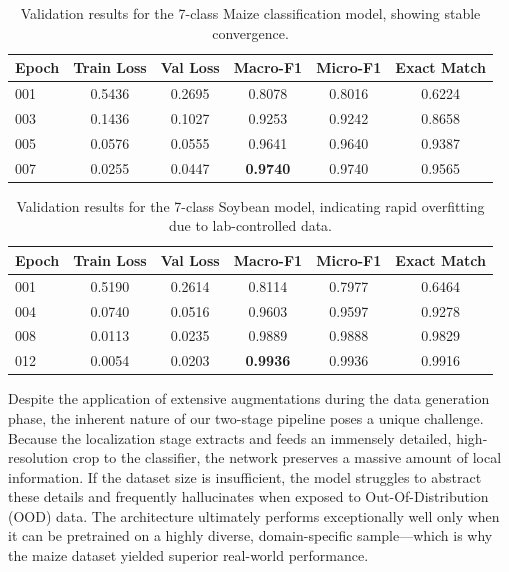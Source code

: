 \begin{table}[h]
\centering
\begin{tabular}{l c c c c c}
\hline
Epoch & Train Loss & Val Loss & Macro-F1 & Micro-F1 & Exact Match \\
\hline
001 & 0.5436 & 0.2695 & 0.8078 & 0.8016 & 0.6224 \\
003 & 0.1436 & 0.1027 & 0.9253 & 0.9242 & 0.8658 \\
005 & 0.0576 & 0.0555 & 0.9641 & 0.9640 & 0.9387 \\
007 & 0.0255 & 0.0447 & \textbf{0.9740} & 0.9740 & 0.9565 \\
\hline
\end{tabular}
\caption{Validation results for the 7-class Maize classification model, showing stable convergence.}
\label{tab:maize_classification}
\end{table}

\begin{table}[h]
\centering
\begin{tabular}{l c c c c c}
\hline
Epoch & Train Loss & Val Loss & Macro-F1 & Micro-F1 & Exact Match \\
\hline
001 & 0.5190 & 0.2614 & 0.8114 & 0.7977 & 0.6464 \\
004 & 0.0740 & 0.0516 & 0.9603 & 0.9597 & 0.9278 \\
008 & 0.0113 & 0.0235 & 0.9889 & 0.9888 & 0.9829 \\
012 & 0.0054 & 0.0203 & \textbf{0.9936} & 0.9936 & 0.9916 \\
\hline
\end{tabular}
\caption{Validation results for the 7-class Soybean model, indicating rapid overfitting due to lab-controlled data.}
\label{tab:soybean_classification}
\end{table}

Despite the application of extensive augmentations during the data generation phase, the inherent nature of our two-stage pipeline poses a unique challenge. Because the localization stage extracts and feeds an immensely detailed, high-resolution crop to the classifier, the network preserves a massive amount of local information. If the dataset size is insufficient, the model struggles to abstract these details and frequently hallucinates when exposed to Out-Of-Distribution (OOD) data. The architecture ultimately performs exceptionally well only when it can be pretrained on a highly diverse, domain-specific sample—which is why the maize dataset yielded superior real-world performance.

